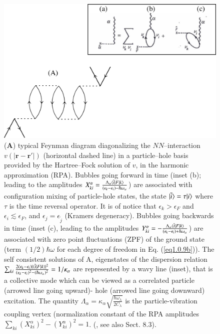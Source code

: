\begin{figure}
	\centerline {
		\includegraphics*[width=12cm]{introduccion/figs/figpreface7}
	}
	\caption{(\textbf{A}) typical Feynman diagram diagonalizing the $NN$--interaction $v(|\mathbf r-\mathbf r'|)$ (horizontal dashed line) in a particle--hole basis provided by the Hartree--Fock solution of $v$, in the harmonic approximation (RPA). Bubbles going forward in time (inset (b); leading to the amplitudes $X^\alpha_{ki}=\frac{\Lambda_\alpha\langle {\tilde i|F|k} \rangle}{(\epsilon_k-\epsilon_i)-\hbar\omega_\alpha}$) are associated with configuration mixing of particle-hole states, the state $|{\tilde i} \rangle=\tau|{i} \rangle$ where $\tau$ is the time reversal operator. It is of notice that $\epsilon_k>\epsilon_F$ and $\epsilon_i\lesssim\epsilon_F$, and $\epsilon_j=\epsilon_{\widetilde j}$ (Kramers degeneracy). Bubbles going backwards in time (inset (c), leading to the amplitudes $Y^\alpha_{ki}=-\frac{\Lambda_\alpha\langle {\tilde i|F|k} \rangle}{(\epsilon_k-\epsilon_i)+\hbar\omega_\alpha}$) are associated with zero point  fluctuations (ZPF) of the ground state (term $(1/2)\hbar\omega$ for each degree of freedom in Eq. (\ref{eq1.0.9b})). The self consistent solutions of A, eigenstates of the dispersion relation $\sum_{ki}\frac{2(\epsilon_k-\epsilon_i)|\langle {\tilde i|F|k} \rangle|^2}{(\epsilon_k-\epsilon_i)^2-(\hbar\omega_\alpha)^2}=1/\kappa_\alpha$ are represented by a wavy line (inset), that is a collective mode which can be viewed as a correlated particle (arrowed line going upward)- hole (arrowed line going downward) excitation. The quantity $\Lambda_\alpha=\kappa_\alpha\sqrt{\frac{\hbar\omega_\lambda}{2C_\lambda}}$ is the particle-vibration coupling vertex (normalization constant of the RPA amplitudes $\sum_{ki}\left(X^\alpha_{ki}\right)^2-\left(Y^\alpha_{ki}\right)^2=1$. (\cite{Bohm:51,Bohm:53}, see also \cite{Brink:05} Sect. 8.3).}
	\label{fig1.0.7}
\end{figure}

